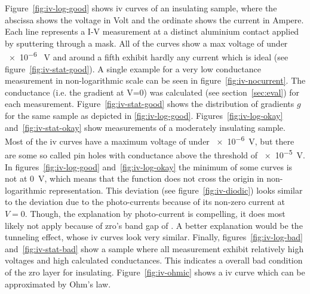 Figure~\ref{fig:iv-log-good} shows \gls{iv} curves of an insulating sample, where the abscissa shows the voltage in Volt and the ordinate shows the current in Ampere. 
Each line represents a I-V measurement at a distinct aluminium contact applied by sputtering through a mask. 
All of the curves show a max voltage of under \num{e-6} \SI{}{\volt} 
and around a fifth exhibit hardly any current which is ideal (see figure~\ref{fig:iv-stat-good}).
A single example for a very low conductance measurement in non-logarithmic scale can be seen in figure~\ref{fig:iv-nocurrent}.
The conductance (i.e. the gradient at V=0) was calculated (see section~\ref{sec:eval}) for each measurement.
Figure~\ref{fig:iv-stat-good} shows the distribution of gradients $g$ for the same sample as depicted in \ref{fig:iv-log-good}.
%
Figures~\ref{fig:iv-log-okay} and~\ref{fig:iv-stat-okay} show measurements of a moderately insulating sample. 
Most of the \gls{iv} curves have a maximum voltage of under \num{e-6}\SI{}{\volt}, 
but there are some so called pin holes with conductance above the threshold of \num{e-5}\SI{}{\volt}. %
%
In figures~\ref{fig:iv-log-good} and~\ref{fig:iv-log-okay} the minimum of some curves 
is not at \SI{0}{\volt}, which means that the function does not cross the origin in non-logarithmic representation. 
%
This deviation (see figure~\ref{fig:iv-diodic}) looks similar to the deviation due to the photo-currents\cite{perez2018solar} because of its non-zero current at $V=0$.
Though, the explanation by photo-current is compelling, it does most likely not apply because of \gls{zro}'s band gap of \cite{sinhamahapatra2016oxygen}.
A better explanation would be the tunneling effect, whose \gls{iv} curves look very similar\cite{feenstra1994scanning,datta1997current}.
%
Finally, figures~\ref{fig:iv-log-bad} and~\ref{fig:iv-stat-bad} show a sample 
where all measurement exhibit relatively high voltages and high calculated conductances. 
This indicates a overall bad condition of the \gls{zro} layer for insulating. 
Figure~\ref{fig:iv-ohmic} shows a \gls{iv} curve which can be approximated by Ohm's law. 
%

